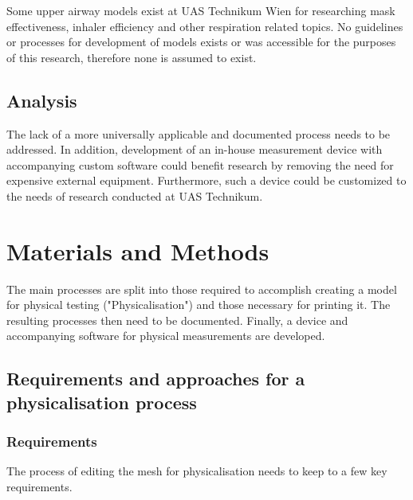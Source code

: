 \documentclass[MME,Projekt,english]{twbook}%
\begin{document}
Some upper airway models exist at UAS Technikum Wien for researching mask effectiveness, inhaler efficiency and other respiration related topics.
No guidelines or processes for development of models exists or was accessible for the purposes of this research, therefore none is assumed to exist.

\section{Analysis}

The lack of a more universally applicable and documented process needs to be addressed. In addition, development of an in-house
measurement device with accompanying custom software could benefit research by removing the need for expensive external equipment. Furthermore,
such a device could be customized to the needs of research conducted at UAS Technikum.

\chapter{Materials and Methods}

The main processes are split into those required to accomplish creating a model for physical testing ("Physicalisation") and those necessary for
printing it. The resulting processes then need to be documented. Finally, a device and accompanying software for physical measurements are developed.

\section{Requirements and approaches for a physicalisation process}

\subsection{Requirements}

The process of editing the mesh for physicalisation needs to keep to a few key requirements.
\end{document}

